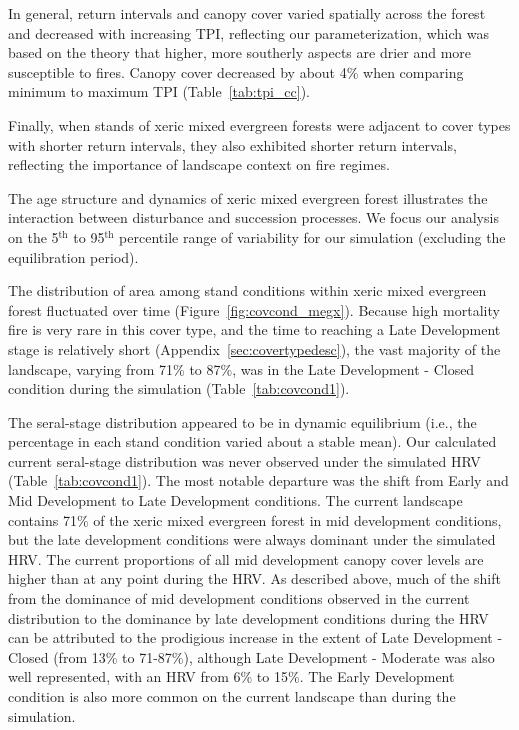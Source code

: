 In general, return intervals and canopy cover varied spatially across the forest and decreased with increasing TPI, reflecting our parameterization, which was based on the theory that higher, more southerly aspects are drier and more susceptible to fires. Canopy cover decreased by about 4\% when comparing minimum to maximum TPI (Table~\ref{tab:tpi_cc}). 

Finally, when stands of xeric mixed evergreen forests were adjacent to cover types with shorter return intervals, they also exhibited shorter return intervals, reflecting the importance of landscape context on fire regimes.

The age structure and dynamics of xeric mixed evergreen forest illustrates the interaction between disturbance and succession processes. We focus our analysis on the 5$^{\text{th}}$ to 95$^{\text{th}}$ percentile range of variability for our simulation (excluding the equilibration period).


The distribution of area among stand conditions within xeric mixed evergreen forest fluctuated over time (Figure~\ref{fig:covcond_megx}). Because high mortality fire is very rare in this cover type, and the time to reaching a Late Development stage is relatively short (Appendix~\ref{sec:covertypedesc}), the vast majority of the landscape, varying from 71\% to 87\%, was in the Late Development - Closed condition during the simulation (Table~\ref{tab:covcond1}). 

The seral-stage distribution appeared to be in dynamic equilibrium (i.e., the percentage in each stand condition varied about a stable mean). Our calculated current seral-stage distribution was never observed under the simulated HRV (Table~\ref{tab:covcond1}). The most notable departure was the shift from Early and Mid Development to Late Development conditions. The current landscape contains 71\% of the xeric mixed evergreen forest in mid development conditions, but the late development conditions were always dominant under the simulated HRV. The current proportions of all mid development canopy cover levels are higher than at any point during the HRV. As described above, much of the shift from the dominance of mid development conditions observed in the current distribution to the dominance by late development conditions during the HRV can be attributed to the prodigious increase in the extent of Late Development - Closed (from 13\% to 71-87\%), although Late Development - Moderate was also well represented, with an HRV from 6\% to 15\%. The Early Development condition is also more common on the current landscape than during the simulation.

